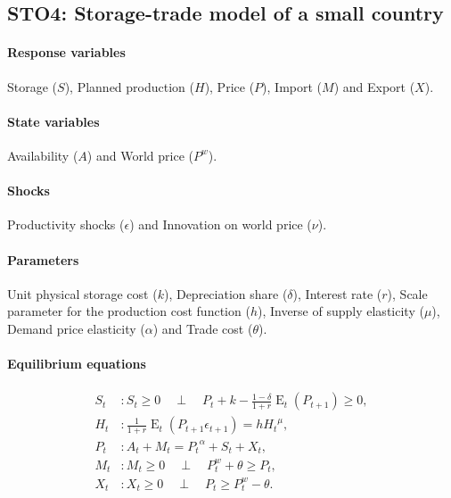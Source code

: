 \documentclass[11pt,fleqn]{article}
\DeclareMathOperator{\E}{E}
\newcommand{\Pw}{P^{w}}
\newcommand{\CP}{\quad \perp \quad}
\begin{document}
\subsection{STO4: Storage-trade model of a small country}
\label{sec:storage-trade-model}


\paragraph{Response variables}

Storage ($S$), Planned production ($H$), Price ($P$), Import ($M$) and Export ($X$).

\paragraph{State variables}

Availability ($A$) and World price ($\Pw$).

\paragraph{Shocks}

Productivity shocks ($\epsilon$) and Innovation on world price ($\nu$).

\paragraph{Parameters}

Unit physical storage cost ($k$), Depreciation share ($\delta$), Interest rate
($r$), Scale parameter for the production cost function ($h$), Inverse of supply
elasticity ($\mu$), Demand price elasticity ($\alpha$) and Trade cost ($\theta$).

\paragraph{Equilibrium equations}

\begin{align}
  S_{t}&: S_{t}\ge 0 \CP P_{t}+k-\frac{1-\delta}{1+r}\E_{t}\left(P_{t+1}\right)\ge 0,\\
  H_{t}&: \frac{1}{1+r}\E_{t}\left(P_{t+1}\epsilon_{t+1}\right)=h {H_{t}}^{\mu},\\
  P_{t}&: A_{t}+M_{t}={P_{t}}^{\alpha}+S_{t}+X_{t},\\
  M_{t}&: M_{t}\ge 0 \CP \Pw_{t}+\theta\ge P_{t},\\
  X_{t}&: X_{t}\ge 0 \CP P_{t}\ge \Pw_{t}-\theta.
\end{align}
\end{document}
